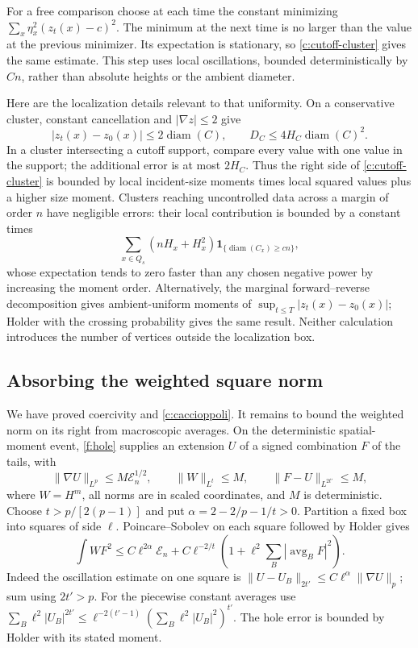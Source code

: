 For a free comparison choose at each time the constant minimizing
$\sum_x\eta_x^2(z_t(x)-c)^2$. The minimum at the next time is no larger
than the value at the previous minimizer. Its expectation is stationary,
so \eqref{c:cutoff-cluster} gives the same estimate. This step uses local
oscillations, bounded deterministically by $Cn$, rather than absolute
heights or the ambient diameter.

Here are the localization details relevant to that uniformity. On a
conservative cluster, constant cancellation and $|\nabla z|\le2$ give
\[
 |z_t(x)-z_0(x)|\le2\operatorname{diam}(C),\qquad
 D_C\le4H_C\operatorname{diam}(C)^2.
\]
In a cluster intersecting a cutoff support, compare every value with
one value in the support; the additional error is at most $2H_C$.
Thus the right side of \eqref{c:cutoff-cluster} is bounded by local
incident-size moments times local squared values plus a higher size
moment. Clusters reaching uncontrolled data across a margin of order
$n$ have negligible errors: their local contribution is bounded by
a constant times
\[
 \sum_{x\in Q_s}(nH_x+H_x^2)
       \mathbf1_{\{\operatorname{diam}(C_x)\ge c n\}},
\]
whose expectation tends to zero faster than any chosen negative power
by increasing the moment order. Alternatively, the marginal
forward--reverse decomposition gives ambient-uniform moments of
$\sup_{t\le T}|z_t(x)-z_0(x)|$; Holder with the crossing probability
gives the same result. Neither calculation introduces the number of
vertices outside the localization box.

\subsection{Absorbing the weighted square norm}

We have proved coercivity and \eqref{c:caccioppoli}. It remains to bound
the weighted norm on its right from macroscopic averages. On the
deterministic spatial-moment event, \ref{f:hole} supplies an extension
$U$ of a signed combination $F$ of the tails, with
\[
 \|\nabla U\|_{L^p}\le M\mathcal E_n^{1/2},\qquad
 \|W\|_{L^t}\le M,\qquad
 \|F-U\|_{L^{2t'}}\le M,
\]
where $W=H^m$, all norms are in scaled coordinates, and $M$ is
deterministic. Choose $t>p/[2(p-1)]$ and put
$\alpha=2-2/p-1/t>0$. Partition a fixed box into squares of side
$\ell$. Poincare--Sobolev on each square followed by Holder gives
\begin{equation}\label{c:interpolation}
 \int WF^2\le C\ell^{2\alpha}\mathcal E_n
 +C\ell^{-2/t}
   \left(1+\ell^2\sum_B|\operatorname{avg}_B F|^2\right).
\end{equation}
Indeed the oscillation estimate on one square is
$\|U-U_B\|_{2t'}\le C\ell^\alpha\|\nabla U\|_p$;
sum using $2t'>p$. For the piecewise constant averages use
$\sum_B\ell^2|U_B|^{2t'}\le
\ell^{-2(t'-1)}(\sum_B\ell^2|U_B|^2)^{t'}$.
The hole error is bounded by Holder with its stated moment.

